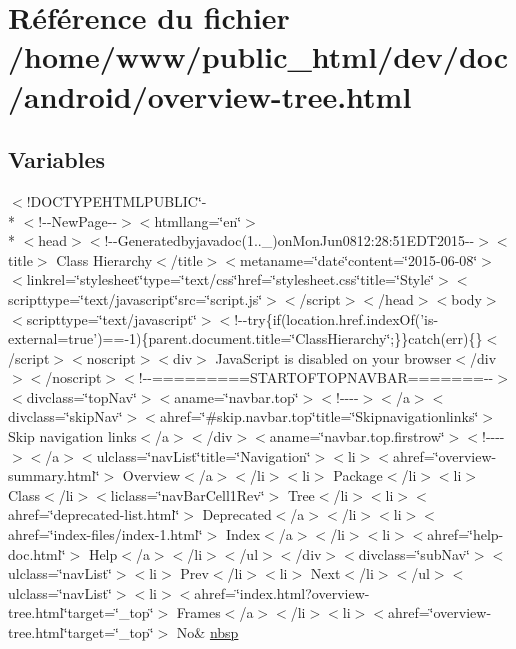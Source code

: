 \hypertarget{overview-tree_8html}{\section{Référence du fichier /home/www/public\-\_\-html/dev/doc/android/overview-\/tree.html}
\label{overview-tree_8html}
}
\subsection*{Variables}
\begin{DoxyCompactItemize}
\item 
$<$!D\-O\-C\-T\-Y\-P\-E\-H\-T\-M\-L\-P\-U\-B\-L\-I\-C\char`\"{}-\/\\*
$<$!-\/-\/New\-Page-\/-\/$>$$<$htmllang=\char`\"{}en\char`\"{}$>$\\*
$<$head$>$$<$!-\/-\/Generatedbyjavadoc(1..\-\_)on\-Mon\-Jun0812\-:28\-:51\-E\-D\-T2015-\/-\/$>$$<$title$>$ Class Hierarchy$<$/title$>$$<$metaname=\char`\"{}date\char`\"{}content=\char`\"{}2015-\/06-\/08\char`\"{}$>$$<$linkrel=\char`\"{}stylesheet\char`\"{}type=\char`\"{}text/css\char`\"{}href=\char`\"{}stylesheet.\-css\char`\"{}title=\char`\"{}\-Style\char`\"{}$>$$<$scripttype=\char`\"{}text/javascript\char`\"{}src=\char`\"{}script.\-js\char`\"{}$>$$<$/script$>$$<$/head$>$$<$body$>$$<$scripttype=\char`\"{}text/javascript\char`\"{}$>$$<$!-\/-\/try\{if(location.\-href.\-index\-Of('is-\/external=true')==-\/1)\{parent.\-document.\-title=\char`\"{}\-Class\-Hierarchy\char`\"{};\}\}catch(err)\{\}$<$/script$>$$<$noscript$>$$<$div$>$ Java\-Script is disabled on your browser$<$/div$>$$<$/noscript$>$$<$!-\/-\/=========\-S\-T\-A\-R\-T\-O\-F\-T\-O\-P\-N\-A\-V\-B\-A\-R=======-\/-\/$>$$<$divclass=\char`\"{}top\-Nav\char`\"{}$>$$<$aname=\char`\"{}navbar.\-top\char`\"{}$>$$<$!-\/-\/-\/-\/$>$$<$/a$>$$<$divclass=\char`\"{}skip\-Nav\char`\"{}$>$$<$ahref=\char`\"{}\#skip.\-navbar.\-top\char`\"{}title=\char`\"{}\-Skipnavigationlinks\char`\"{}$>$ Skip navigation links$<$/a$>$$<$/div$>$$<$aname=\char`\"{}navbar.\-top.\-firstrow\char`\"{}$>$$<$!-\/-\/-\/-\/$>$$<$/a$>$$<$ulclass=\char`\"{}nav\-List\char`\"{}title=\char`\"{}\-Navigation\char`\"{}$>$$<$li$>$$<$ahref=\char`\"{}overview-\/summary.\-html\char`\"{}$>$ Overview$<$/a$>$$<$/li$>$$<$li$>$ Package$<$/li$>$$<$li$>$ Class$<$/li$>$$<$liclass=\char`\"{}nav\-Bar\-Cell1\-Rev\char`\"{}$>$ Tree$<$/li$>$$<$li$>$$<$ahref=\char`\"{}deprecated-\/list.\-html\char`\"{}$>$ Deprecated$<$/a$>$$<$/li$>$$<$li$>$$<$ahref=\char`\"{}index-\/files/index-\/1.\-html\char`\"{}$>$ Index$<$/a$>$$<$/li$>$$<$li$>$$<$ahref=\char`\"{}help-\/doc.\-html\char`\"{}$>$ Help$<$/a$>$$<$/li$>$$<$/ul$>$$<$/div$>$$<$divclass=\char`\"{}sub\-Nav\char`\"{}$>$$<$ulclass=\char`\"{}nav\-List\char`\"{}$>$$<$li$>$ Prev$<$/li$>$$<$li$>$ Next$<$/li$>$$<$/ul$>$$<$ulclass=\char`\"{}nav\-List\char`\"{}$>$$<$li$>$$<$ahref=\char`\"{}index.\-html?overview-\/tree.\-html\char`\"{}target=\char`\"{}\-\_\-top\char`\"{}$>$ Frames$<$/a$>$$<$/li$>$$<$li$>$$<$ahref=\char`\"{}overview-\/tree.\-html\char`\"{}target=\char`\"{}\-\_\-top\char`\"{}$>$ No\& \hyperlink{overview-tree_8html_af43198c3b54c4bc836554c5ac67d0f12}{nbsp}

\end{DoxyCompactItemize}
